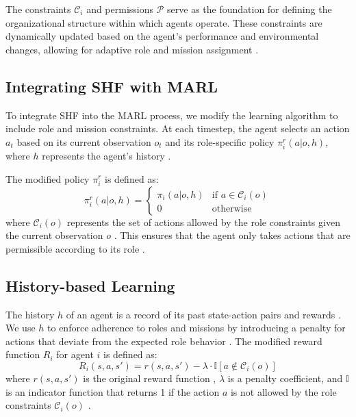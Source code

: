 \documentclass[sigconf,anonymous]{aamas}
\begin{document}
The constraints $\mathcal{C}_i$ and permissions $\mathcal{P}$ serve as the foundation for defining the organizational structure within which agents operate. These constraints are dynamically updated based on the agent's performance and environmental changes, allowing for adaptive role and mission assignment \cite{foerster2018counterfactual}.


\subsection{Integrating SHF with MARL}
To integrate SHF into the MARL process, we modify the learning algorithm to include role and mission constraints. At each timestep, the agent selects an action $a_t$ based on its current observation $o_t$ and its role-specific policy $\pi_i^r(a | o, h)$, where $h$ represents the agent's history \cite{hubner2010moise}.

The modified policy $\pi_i^r$ is defined as:
\[
\pi_i^r(a | o, h) = 
\begin{cases}
\pi_i(a | o, h) & \text{if } a \in \mathcal{C}_i(o) \\
0 & \text{otherwise}
\end{cases}
\]
where $\mathcal{C}_i(o)$ represents the set of actions allowed by the role constraints given the current observation $o$ \cite{hubner2010moise}. This ensures that the agent only takes actions that are permissible according to its role \cite{hernandez2019survey, castaneda2019policy}.


\subsection{History-based Learning}
The history $h$ of an agent is a record of its past state-action pairs and rewards \cite{foerster2018counterfactual}. We use $h$ to enforce adherence to roles and missions by introducing a penalty for actions that deviate from the expected role behavior \cite{wei2019safe}. The modified reward function $R_i$ for agent $i$ is defined as:
\[
R_i(s, a, s') = r(s, a, s') - \lambda \cdot \mathbb{I}[a \notin \mathcal{C}_i(o)]
\]
where $r(s, a, s')$ is the original reward function \cite{lowe2017multi}, $\lambda$ is a penalty coefficient, and $\mathbb{I}$ is an indicator function that returns 1 if the action $a$ is not allowed by the role constraints $\mathcal{C}_i(o)$ \cite{hubner2010moise}.
\end{document}

